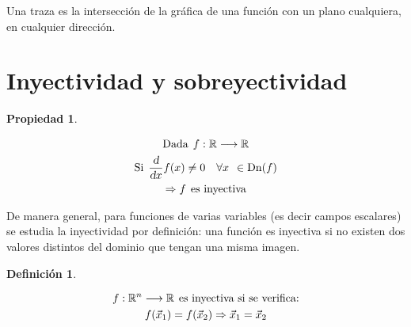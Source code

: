 \documentclass[a5paper,12pt,twoside]{book}
\newtheorem{defn}{{Definición}}[chapter]
\newtheorem{prop}{{Propiedad}}[chapter]
\begin{document}

Una traza es la intersección de la gráfica de una función con un plano cualquiera, en cualquier dirección.


\section{Inyectividad y sobreyectividad}

\begin{mdframed}[style=PropertyFrame]
    \begin{prop}
    \end{prop}
    \begin{gather*}
        \textrm{Dada} \hspace{1ex} f: \mathbb{R} \longrightarrow \mathbb{R}
        \\
        \textrm{Si} \hspace{1ex} \frac{\textsl{d}}{\textsl{d} x} f(x) \neq 0 \quad \forall x \hspace{1ex} \in \operatorname{Dn}(f)
        \\
        \Rightarrow f \hspace{1ex} \textrm{es inyectiva}
    \end{gather*}
\end{mdframed}

De manera general, para funciones de varias variables (es decir campos escalares) se estudia la inyectividad por definición: una función es inyectiva si no existen dos valores distintos del dominio que tengan una misma imagen.

\begin{mdframed}[style=DefinitionFrame]
    \begin{defn}
    \end{defn}
    \begin{gather*}
        f: \mathbb{R}^n \longrightarrow \mathbb{R} \hspace{1ex} \textrm{es inyectiva si se verifica:}
        \\
        f(\Vec{x}_1)=f(\Vec{x}_2) \Rightarrow \Vec{x}_1=\Vec{x}_2
    \end{gather*}
\end{mdframed}
\end{document}
